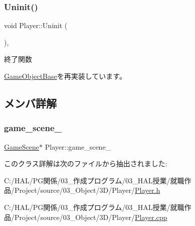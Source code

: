 \subsubsection{\texorpdfstring{Uninit()}{Uninit()}}
{\footnotesize\ttfamily void Player\+::\+Uninit (\begin{DoxyParamCaption}{ }\end{DoxyParamCaption})\hspace{0.3cm}{\ttfamily [override]}, {\ttfamily [virtual]}}



終了関数 



\mbox{\hyperlink{class_game_object_base_a97e1bc277d7b1c0156d4735de29a022c}{Game\+Object\+Base}}を再実装しています。



\subsection{メンバ詳解}
\mbox{\label{class_player_ab41e7ebf6f975f2eea365923bc2dca7f}} 
\subsubsection{\texorpdfstring{game\+\_\+scene\+\_\+}{game\_scene\_}}
{\footnotesize\ttfamily \mbox{\hyperlink{class_game_scene}{Game\+Scene}}$\ast$ Player\+::game\+\_\+scene\+\_\+}



このクラス詳解は次のファイルから抽出されました\+:\begin{DoxyCompactItemize}
\item 
C\+:/\+H\+A\+L/\+P\+G関係/03\+\_\+作成プログラム/03\+\_\+\+H\+A\+L授業/就職作品/\+Project/source/03\+\_\+\+Object/3\+D/\+Player/\mbox{\hyperlink{_player_8h}{Player.\+h}}\item 
C\+:/\+H\+A\+L/\+P\+G関係/03\+\_\+作成プログラム/03\+\_\+\+H\+A\+L授業/就職作品/\+Project/source/03\+\_\+\+Object/3\+D/\+Player/\mbox{\hyperlink{_player_8cpp}{Player.\+cpp}}\end{DoxyCompactItemize}
